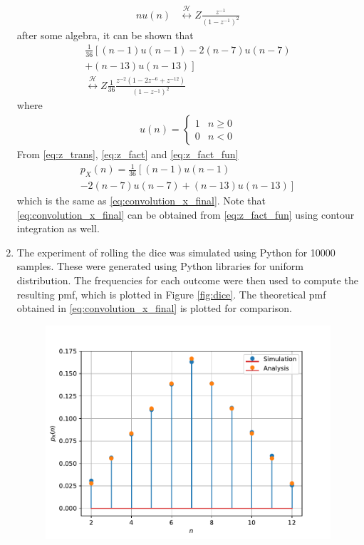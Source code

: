 \documentclass[journal,15pt,twocolumn]{IEEEtran}
\providecommand{\lsbrak}[1]{\ensuremath{{}\left[#1\right.}}
\providecommand{\rsbrak}[1]{\ensuremath{{}\left.#1\right]}}
\providecommand{\brak}[1]{\ensuremath{\left(#1\right)}}
\providecommand{\system}{\overset{\mathcal{H}}{ \longleftrightarrow}}
\begin{document}
\begin{enumerate}
\begin{align}
nu(n)&\system{Z} \frac{z^{-1}}{\brak{1-z^{-1}}^2}
\end{align}
after some algebra, it can be shown that
\begin{multline}
\frac{1}{36}\lsbrak{\brak{n-1}u(n-1) - 2 \brak{n-7}u(n-7)}
\\
\rsbrak{ +\brak{n-13}u(n-13)}
\\
\system{Z}
\frac{1}{36}\frac{z^{-2}\brak{1-2z^{-6}+z^{-12}}}{\brak{1-z^{-1}}^2}
\label{eq:z_fact_fun}
\end{multline}
where 
\begin{align}
u(n) =
\begin{cases}
1 & n \ge 0
\\
0 & n < 0
\end{cases}
\end{align}
From \eqref{eq:z_trans}, \eqref{eq:z_fact} and \eqref{eq:z_fact_fun}
\begin{multline}
p_{X}(n) = \frac{1}{36}\lsbrak{\brak{n-1}u(n-1) 
}
\\
\rsbrak{- 2 \brak{n-7}u(n-7)+\brak{n-13}u(n-13)}
\end{multline}
which is the same as \eqref{eq:convolution_x_final}.  Note that  \eqref{eq:convolution_x_final} can be obtained from \eqref{eq:z_fact_fun} using contour integration as well.
\item 
The experiment of rolling the dice was simulated using Python for 10000 samples.  These were generated using Python libraries for uniform distribution. The frequencies for each outcome were then used to compute the resulting pmf, which  is plotted in Figure \ref{fig:dice}.  The theoretical pmf obtained in \eqref{eq:convolution_x_final} is plotted for comparison.  
%
\begin{figure}[H]
\centering
\includegraphics[width=\columnwidth]{./figs/chapter2/two_dices.pdf}

\end{figure}
\end{enumerate}
\end{document}
